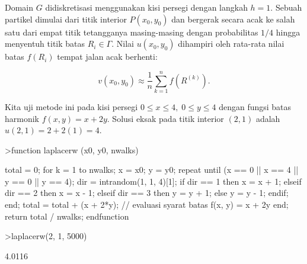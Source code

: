 \documentclass[a4paper,11pt,oneside,enabledeprecatedfontcommands]{scrbook}
\newenvironment{eulernotebook}{}{}
\newenvironment{eulercomment}{\par\medskip\noindent}{\par\medskip}
\newenvironment{eulerformula}{}{}
\begin{document}
\begin{eulernotebook}
\begin{eulercomment}
			Domain $G$ didiskretisasi menggunakan kisi persegi dengan langkah $h = 1$. Sebuah partikel dimulai dari
			titik interior $P(x_0, y_0)$ dan bergerak secara acak ke salah satu dari empat titik tetangganya
			masing-masing dengan probabilitas $1/4$ hingga menyentuh titik batas $R_i \in \Gamma$. Nilai $u(x_0, y_0)$
			dihampiri oleh rata-rata nilai batas $f(R_i)$ tempat jalan acak berhenti:
		\end{eulercomment}
		\begin{eulerformula}
			\[
			v(x_0, y_0) \approx \frac{1}{n} \sum_{k=1}^n f(R^{(k)}).
			\]
		\end{eulerformula}
		\begin{eulercomment}
			Kita uji metode ini pada kisi persegi $0 \le x \le 4, \; 0 \le y \le 4$
			dengan fungsi batas harmonik $f(x, y) = x + 2y$. Solusi eksak pada titik interior $(2, 1)$ adalah $u(2, 1) = 2 + 2(1) = 4$.
		\end{eulercomment}
		\begin{eulerprompt}
			>function laplacerw (x0, y0, nwalks)
		\end{eulerprompt}
		\begin{eulerudf}
			total = 0;
			for k = 1 to nwalks;
			  x = x0; y = y0;
			  repeat
			    until (x == 0 || x == 4 || y == 0 || y == 4);
			    dir = intrandom(1, 1, 4)[1];
			    if dir == 1 then x = x + 1;
			    elseif dir == 2 then x = x - 1;
			    elseif dir == 3 then y = y + 1;
			    else y = y - 1;
			    endif;
			  end;
			  total = total + (x + 2*y); // evaluasi syarat batas f(x, y) = x + 2y
			end;
			return total / nwalks;
			endfunction
		\end{eulerudf}
		\begin{eulerprompt}
			>laplacerw(2, 1, 5000)
		\end{eulerprompt}
		\begin{euleroutput}
			4.0116
		\end{euleroutput}
	\end{eulernotebook}
\end{document}
